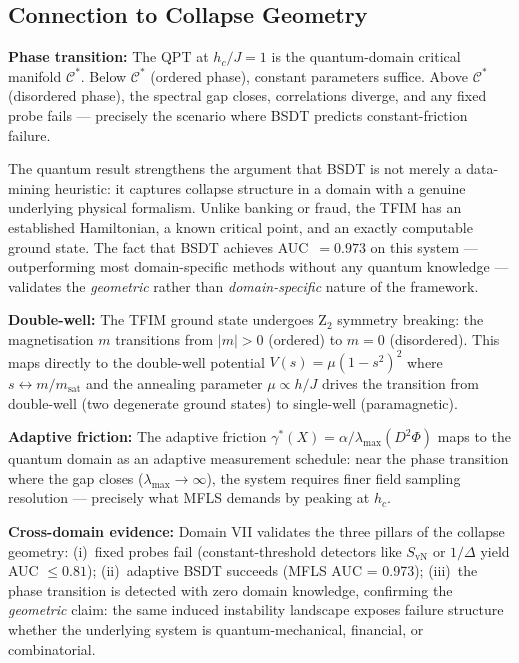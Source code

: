 \documentclass[11pt,a4paper]{article}
\newcommand{\Cman}{\mathcal{C}^*}
\begin{document}
\subsection{Connection to Collapse Geometry}

\textbf{Phase transition:}
The QPT at $h_c/J = 1$ is the quantum-domain critical manifold $\Cman$.
Below $\Cman$ (ordered phase), constant parameters suffice.  Above
$\Cman$ (disordered phase), the spectral gap closes, correlations
diverge, and any fixed probe fails --- precisely the scenario where
BSDT predicts constant-friction failure.

The quantum result strengthens the argument that BSDT is not merely
a data-mining heuristic: it captures collapse structure in a domain
with a genuine underlying physical formalism.  Unlike banking or
fraud, the TFIM has an established Hamiltonian, a known critical
point, and an exactly computable ground state.  The fact that BSDT
achieves AUC~$= 0.973$ on this system --- outperforming most
domain-specific methods without any quantum knowledge --- validates
the \emph{geometric} rather than \emph{domain-specific} nature of
the framework.

\textbf{Double-well:}
The TFIM ground state undergoes Z$_2$ symmetry breaking: the
magnetisation $m$ transitions from $|m| > 0$ (ordered) to $m = 0$
(disordered).  This maps directly to the double-well potential
$V(s) = \mu(1 - s^2)^2$ where $s \leftrightarrow m/m_{\mathrm{sat}}$
and the annealing parameter $\mu \propto h/J$ drives the transition
from double-well (two degenerate ground states) to single-well
(paramagnetic).

\textbf{Adaptive friction:}
The adaptive friction $\gamma^*(X) = \alpha / \lambda_{\max}(D^2\Phi)$
maps to the quantum domain as an adaptive measurement schedule:
near the phase transition where the gap closes ($\lambda_{\max}
\to \infty$), the system requires finer field sampling resolution ---
precisely what MFLS demands by peaking at $h_c$.

\textbf{Cross-domain evidence:}
Domain VII validates the three pillars of the collapse geometry:
(i)~fixed probes fail (constant-threshold detectors like
$S_{\mathrm{vN}}$ or $1/\Delta$ yield AUC $\le 0.81$);
(ii)~adaptive BSDT succeeds (MFLS AUC = 0.973);
(iii)~the phase transition is detected with zero domain knowledge,
confirming the \emph{geometric} claim: the same induced instability
landscape exposes failure structure whether the underlying system is
quantum-mechanical, financial, or combinatorial.
\end{document}
